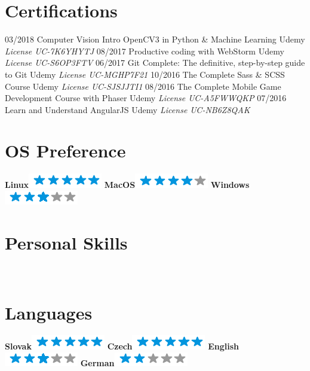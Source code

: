 \documentclass[]{friggeri-cv}
\begin{document}
\section{Certifications}
\begin{entrylist}
  \entry
    {03/2018}
    {Computer Vision Intro OpenCV3 in Python \& Machine Learning}
    {Udemy}
    {\emph{License UC-7K6YHYTJ}}
  \entry
    {08/2017}
    {Productive coding with WebStorm}
    {Udemy}
    {\emph{License UC-S6OP3FTV}}
  \entry
    {06/2017}
    {Git Complete: The definitive, step-by-step guide to Git}
    {Udemy}
    {\emph{License UC-MGHP7F21}}
  \entry
    {10/2016}
    {The Complete Sass \& SCSS Course}
    {Udemy}
    {\emph{License UC-SJSJJTI1}}
  \entry
    {08/2016}
    {The Complete Mobile Game Development Course with Phaser}
    {Udemy}
    {\emph{License UC-A5FWWQKP}}
  \entry
    {07/2016}
    {Learn and Understand AngularJS}
    {Udemy}
    {\emph{License UC-NB6Z8QAK}}
\end{entrylist}

\begin{aside}
\section{OS Preference}
    \textbf{Linux}\includegraphics[scale=0.40]{img/5stars.png}
    \textbf{MacOS}\includegraphics[scale=0.40]{img/4stars.png}
    \textbf{Windows}\includegraphics[scale=0.40]{img/3stars.png}
    ~
\section{Personal Skills}
    ~
\section{Languages}
    \textbf{Slovak}\includegraphics[scale=0.40]{img/5stars.png}
    \textbf{Czech}\includegraphics[scale=0.40]{img/5stars.png}
    \textbf{English}\includegraphics[scale=0.40]{img/3stars.png}
    \textbf{German}\includegraphics[scale=0.40]{img/2stars.png}
    ~
\end{aside}
\end{document}
